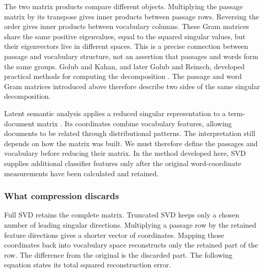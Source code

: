 \documentclass[10pt,letterpaper]{article}
\begin{document}
The two matrix products compare different objects. Multiplying the passage matrix by its transpose gives inner products between passage rows. Reversing the order gives inner products between vocabulary columns. These Gram matrices share the same positive eigenvalues, equal to the squared singular values, but their eigenvectors live in different spaces. This is a precise connection between passage and vocabulary structure, not an assertion that passages and words form the same groups. Golub and Kahan, and later Golub and Reinsch, developed practical methods for computing the decomposition \cite{golubkahan,golubreinsch}. The passage and word Gram matrices introduced above therefore describe two sides of the same singular decomposition.\par

Latent semantic analysis applies a reduced singular representation to a term-document matrix \cite{lsa}. Its coordinates combine vocabulary features, allowing documents to be related through distributional patterns. The interpretation still depends on how the matrix was built. We must therefore define the passages and vocabulary before reducing their matrix. In the method developed here, SVD supplies additional classifier features only after the original word-coordinate measurements have been calculated and retained.\par

\subsubsection{What compression discards}
Full SVD retains the complete matrix. Truncated SVD keeps only a chosen number of leading singular directions. Multiplying a passage row by the retained feature directions gives a shorter vector of coordinates. Mapping those coordinates back into vocabulary space reconstructs only the retained part of the row. The difference from the original is the discarded part. The following equation states its total squared reconstruction error.\par
\end{document}
